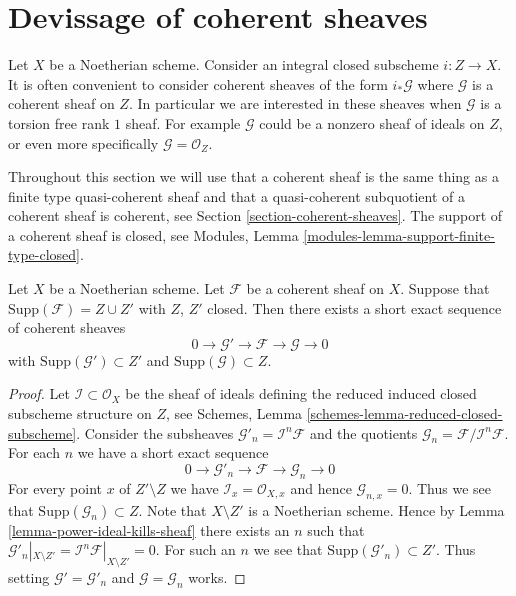 \section{Devissage of coherent sheaves}
\label{section-devissage}

\noindent
Let $X$ be a Noetherian scheme. Consider an integral closed subscheme
$i : Z \to X$. It is often convenient to consider coherent sheaves of
the form $i_*\mathcal{G}$ where $\mathcal{G}$ is a coherent sheaf on
$Z$. In particular we are interested in these sheaves when $\mathcal{G}$
is a torsion free rank $1$ sheaf. For example $\mathcal{G}$ could be
a nonzero sheaf of ideals on $Z$, or even more specifically
$\mathcal{G} = \mathcal{O}_Z$.

\medskip\noindent
Throughout this section we will use that a coherent sheaf is the
same thing as a finite type quasi-coherent sheaf and that a
quasi-coherent subquotient of a coherent sheaf is coherent, see
Section \ref{section-coherent-sheaves}.
The support of a coherent sheaf is closed, see
Modules, Lemma \ref{modules-lemma-support-finite-type-closed}.

\begin{lemma}
\label{lemma-prepare-filter-support}
Let $X$ be a Noetherian scheme.
Let $\mathcal{F}$ be a coherent sheaf on $X$.
Suppose that $\text{Supp}(\mathcal{F}) = Z \cup Z'$ with $Z$, $Z'$ closed.
Then there exists a short exact sequence of coherent sheaves
$$
0 \to \mathcal{G}' \to \mathcal{F} \to \mathcal{G} \to 0
$$
with $\text{Supp}(\mathcal{G}') \subset Z'$ and
$\text{Supp}(\mathcal{G}) \subset Z$.
\end{lemma}

\begin{proof}
Let $\mathcal{I} \subset \mathcal{O}_X$ be the sheaf of ideals
defining the reduced induced closed subscheme structure on $Z$, see
Schemes, Lemma \ref{schemes-lemma-reduced-closed-subscheme}.
Consider the subsheaves
$\mathcal{G}'_n = \mathcal{I}^n\mathcal{F}$ and the
quotients $\mathcal{G}_n = \mathcal{F}/\mathcal{I}^n\mathcal{F}$.
For each $n$ we have a short exact sequence
$$
0 \to \mathcal{G}'_n \to \mathcal{F} \to \mathcal{G}_n \to 0
$$
For every point $x$ of $Z' \setminus Z$ we have
$\mathcal{I}_x = \mathcal{O}_{X, x}$
and hence $\mathcal{G}_{n, x} = 0$. Thus we see that
$\text{Supp}(\mathcal{G}_n) \subset Z$. Note that $X \setminus Z'$
is a Noetherian scheme. Hence by Lemma \ref{lemma-power-ideal-kills-sheaf}
there exists an $n$ such that
$\mathcal{G}'_n|_{X \setminus Z'} =
\mathcal{I}^n\mathcal{F}|_{X \setminus Z'} = 0$.
For such an $n$ we see that $\text{Supp}(\mathcal{G}'_n) \subset Z'$.
Thus setting
$\mathcal{G}' = \mathcal{G}'_n$ and $\mathcal{G} = \mathcal{G}_n$
works.
\end{proof}

